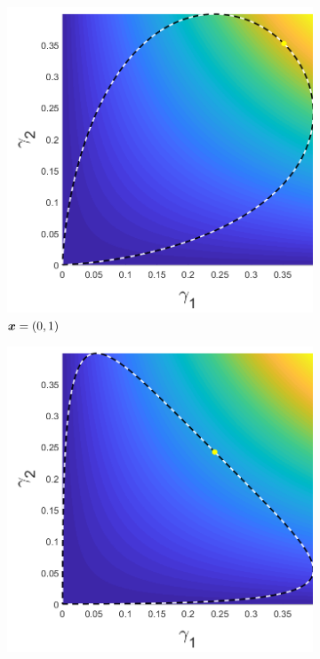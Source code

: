 		\begin{figure}[ht]
			\begin{subfigure}[t]{0.32\textwidth}
				\centering
				\includegraphics[width = \textwidth]{Sigma1x1_0-x2_1}
				\caption{${\bm{{x}}} = (0,1)$} \label{subfig:gammaexamplea}
			\end{subfigure}
			\begin{subfigure}[t]{0.32\textwidth}
				\centering
				\includegraphics[width = \textwidth]{Sigma1x1_0-x2_2}

\end{subfigure}
\end{figure}
